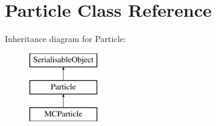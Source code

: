 \hypertarget{classParticle}{\section{Particle Class Reference}
\label{classParticle}
}
Inheritance diagram for Particle\-:\begin{figure}[H]
\begin{center}
\leavevmode
\includegraphics[height=3.000000cm]{classParticle}
\end{center}
\end{figure}
